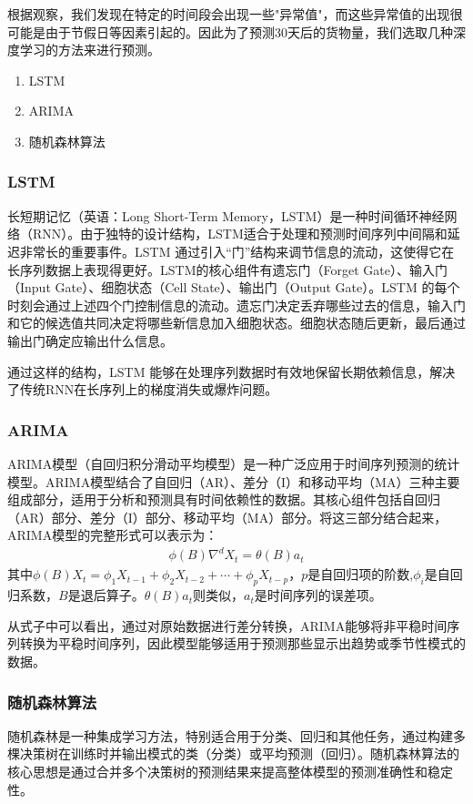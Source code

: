 \documentclass[UTF8,a4paper,10 pt]{article}%
\begin{document}
根据观察，我们发现在特定的时间段会出现一些"异常值"，而这些异常值的出现很可能是由于节假日等因素引起的。因此为了预测30天后的货物量，我们选取几种深度学习的方法来进行预测。
\begin{enumerate}
	\item LSTM
	\item ARIMA
	\item 随机森林算法
\end{enumerate}
\subsubsection{LSTM}
长短期记忆（英语：Long Short-Term Memory，LSTM）是一种时间循环神经网络（RNN）。由于独特的设计结构，LSTM适合于处理和预测时间序列中间隔和延迟非常长的重要事件。LSTM 通过引入“门”结构来调节信息的流动，这使得它在长序列数据上表现得更好。LSTM的核心组件有遗忘门（Forget Gate）、输入门（Input Gate）、细胞状态（Cell State）、输出门（Output Gate）。LSTM 的每个时刻会通过上述四个门控制信息的流动。遗忘门决定丢弃哪些过去的信息，输入门和它的候选值共同决定将哪些新信息加入细胞状态。细胞状态随后更新，最后通过输出门确定应输出什么信息。

通过这样的结构，LSTM 能够在处理序列数据时有效地保留长期依赖信息，解决了传统RNN在长序列上的梯度消失或爆炸问题。

\subsubsection{ARIMA}
ARIMA模型（自回归积分滑动平均模型）是一种广泛应用于时间序列预测的统计模型。ARIMA模型结合了自回归（AR）、差分（I）和移动平均（MA）三种主要组成部分，适用于分析和预测具有时间依赖性的数据。其核心组件包括自回归（AR）部分、差分（I）部分、移动平均（MA）部分。将这三部分结合起来，ARIMA模型的完整形式可以表示为：
\begin{align*}
	\phi (B)\nabla^d X_t = \theta(B)a_t
\end{align*}
其中\(\phi (B) X_t = \phi_1X_{t-1}+\phi_2X_{t-2}+\cdots+\phi_p X_{t-p}\)，$p$是自回归项的阶数,\(\phi_i\)是自回归系数，\(B\)是退后算子。\(\theta(B) 	a_t\)则类似，\(a_t\)是时间序列的误差项。

从式子中可以看出，通过对原始数据进行差分转换，ARIMA能够将非平稳时间序列转换为平稳时间序列，因此模型能够适用于预测那些显示出趋势或季节性模式的数据。
\subsubsection{随机森林算法}
随机森林是一种集成学习方法，特别适合用于分类、回归和其他任务，通过构建多棵决策树在训练时并输出模式的类（分类）或平均预测（回归）。随机森林算法的核心思想是通过合并多个决策树的预测结果来提高整体模型的预测准确性和稳定性。
\end{document}
